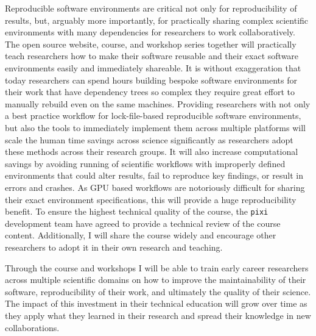 \documentclass[letterpaper, 11pt]{article}
\newcommand{\pixi}{\texttt{pixi}}
\begin{document}

Reproducible software environments are critical not only for reproducibility of results, but, arguably more importantly, for practically sharing complex scientific environments with many dependencies for researchers to work collaboratively.
The open source website, course, and workshop series together will practically teach researchers how to make their software reusable and their exact software environments easily and immediately shareable.
It is without exaggeration that today researchers can spend hours building bespoke software environments for their work that have dependency trees so complex they require great effort to manually rebuild even on the same machines.
Providing researchers with not only a best practice workflow for lock-file-based reproducible software environments, but also the tools to immediately implement them across multiple platforms will scale the human time savings across science significantly as researchers adopt these methods across their research groups.
It will also increase computational savings by avoiding running of scientific workflows with improperly defined environments that could alter results, fail to reproduce key findings, or result in errors and crashes.
As GPU based workflows are notoriously difficult for sharing their exact environment specifications, this will provide a huge reproducibility benefit.
To ensure the highest technical quality of the course, the \pixi{} development team have agreed to provide a technical review of the course content.
Additionally, I will share the course widely and encourage other researchers to adopt it in their own research and teaching.

Through the course and workshops I will be able to train early career researchers across multiple scientific domains on how to improve the maintainability of their software, reproducibility of their work, and ultimately the quality of their science.
The impact of this investment in their technical education will grow over time as they apply what they learned in their research and spread their knowledge in new collaborations.
\end{document}
